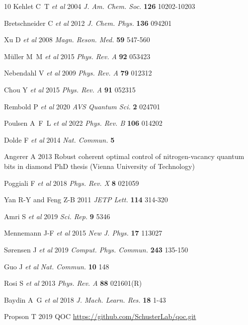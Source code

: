 \documentclass[letterpaper,10pt]{iopart}
\begin{document}
\begin{thebibliography}{10}
Kehlet C~T {\em et al\/} 
2004
{\em J. Am. Chem. Soc. }
{\bf126} 10202-10203  

Bretschneider C {\em et al\/} 
2012
{\em J. Chem. Phys.}
{\bf136} 094201 

Xu D {\em et al\/} 
2008
{\em Magn. Reson. Med.}
\textbf{59} 547-560  

Müller M~M {\em et al\/} 
2015
{\em Phys. Rev. A}
{\bf92} 053423 

Nebendahl V {\em et al\/}  
2009
{\em Phys. Rev. A}
{\bf79} 012312  

Chou Y {\em et al\/}
2015
{\em Phys. Rev. A}
{\bf91} 052315  

Rembold P {\em et al\/}
2020
{\em AVS Quantum Sci.}
{\bf2} 024701 

Poulsen A~F~L {\em et al\/}
2022
{\em Phys. Rev. B}
\textbf{106} 014202  

Dolde F {\em et al\/}
2014
{\em Nat. Commun.}
{\bf5} 

Angerer A
2013
Robust coherent optimal control of nitrogen-vacancy quantum bits in diamond
PhD thesis (Vienna University of Technology)

Poggiali F {\em et al\/}
2018
{\em Phys. Rev. X}
{\bf8} 021059 

Yan R-Y and Feng Z-B
2011
{\em JETP Lett.}
{\bf114} 314-320 

Amri S {\em et al\/}
2019
{\em Sci. Rep.}
{\bf9} 5346 

Mennemann J-F {\em et al\/}
2015
{\em New J. Phys.}
{\bf17} 113027

Sørensen J {\em et al\/}
2019
{\em Comput. Phys. Commun.}
{\bf243} 135-150 

Guo J {\em et al\/}
{\em Nat. Commun.}
{\bf10} 148 

Rosi S {\em et al\/}
2013
{\em Phys. Rev. A}
{\bf88} 021601(R) 

Baydin A~G {\em et al\/} 
2018
{\em J. Mach. Learn. Res.}
{\bf18} 1-43 

Propson T
2019
QOC
\url{https://github.com/SchusterLab/qoc.git} 


\end{thebibliography}
\end{document}
